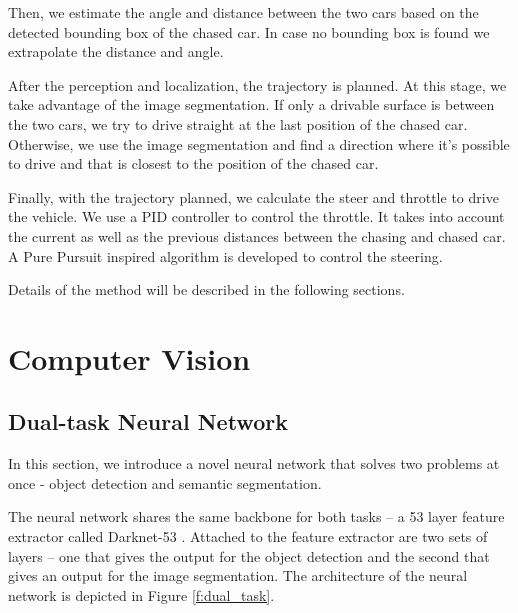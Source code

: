 \documentclass{ctuthesis/ctuthesis}
\begin{document}
Then, we estimate the angle and distance between the two cars based on the detected bounding box of the chased car. In case no bounding box is found we extrapolate the distance and angle. \par


After the perception and localization, the trajectory is planned. At this stage, we take advantage of the image segmentation. If only a drivable surface is between the two cars, we try to drive straight at the last position of the chased car. Otherwise, we use the image segmentation and find a direction where it's possible to drive and that is closest to the position of the chased car. \par


Finally, with the trajectory planned, we calculate the steer and throttle to drive the vehicle. We use a PID controller \cite{PID_orig} to control the throttle. It takes into account the current as well as the previous distances between the chasing and chased car. A Pure Pursuit \cite{pure_pursuit_orig} inspired algorithm is developed to control the steering. \par

Details of the method will be described in the following sections.




\section{Computer Vision}
\subsection{Dual-task Neural Network}
In this section, we introduce a novel neural network that solves two problems at once - object detection and semantic segmentation. \par


The neural network shares the same backbone for both tasks -- a 53 layer feature extractor called Darknet-53 \cite{YOLOv3}. Attached to the feature extractor are two sets of layers -- one that gives the output for the object detection and the second that gives an output for the image segmentation. The architecture of the neural network is depicted in Figure \ref{f:dual_task}.\par
\end{document}
